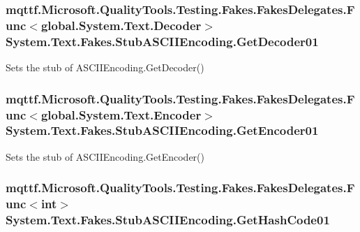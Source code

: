 \hypertarget{class_system_1_1_text_1_1_fakes_1_1_stub_a_s_c_i_i_encoding_ae6aae5586f06bd1278a3f6c0851dbeb7}{
\subsubsection[{Get\-Decoder01}]{\setlength{\rightskip}{0pt plus 5cm}mqttf.\-Microsoft.\-Quality\-Tools.\-Testing.\-Fakes.\-Fakes\-Delegates.\-Func$<$global.\-System.\-Text.\-Decoder$>$ System.\-Text.\-Fakes.\-Stub\-A\-S\-C\-I\-I\-Encoding.\-Get\-Decoder01}}\label{class_system_1_1_text_1_1_fakes_1_1_stub_a_s_c_i_i_encoding_ae6aae5586f06bd1278a3f6c0851dbeb7}


Sets the stub of A\-S\-C\-I\-I\-Encoding.\-Get\-Decoder()

\hypertarget{class_system_1_1_text_1_1_fakes_1_1_stub_a_s_c_i_i_encoding_a31409111551c1581bc1deca18478240b}{
\subsubsection[{Get\-Encoder01}]{\setlength{\rightskip}{0pt plus 5cm}mqttf.\-Microsoft.\-Quality\-Tools.\-Testing.\-Fakes.\-Fakes\-Delegates.\-Func$<$global.\-System.\-Text.\-Encoder$>$ System.\-Text.\-Fakes.\-Stub\-A\-S\-C\-I\-I\-Encoding.\-Get\-Encoder01}}\label{class_system_1_1_text_1_1_fakes_1_1_stub_a_s_c_i_i_encoding_a31409111551c1581bc1deca18478240b}


Sets the stub of A\-S\-C\-I\-I\-Encoding.\-Get\-Encoder()

\hypertarget{class_system_1_1_text_1_1_fakes_1_1_stub_a_s_c_i_i_encoding_ac5d32b99f5be4b076207721f991a1c17}{
\subsubsection[{Get\-Hash\-Code01}]{\setlength{\rightskip}{0pt plus 5cm}mqttf.\-Microsoft.\-Quality\-Tools.\-Testing.\-Fakes.\-Fakes\-Delegates.\-Func$<$int$>$ System.\-Text.\-Fakes.\-Stub\-A\-S\-C\-I\-I\-Encoding.\-Get\-Hash\-Code01}}\label{class_system_1_1_text_1_1_fakes_1_1_stub_a_s_c_i_i_encoding_ac5d32b99f5be4b076207721f991a1c17}


